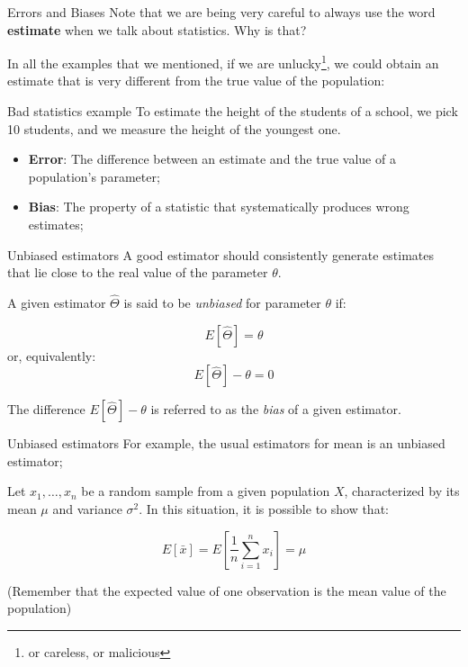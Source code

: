 \begin{frame}{Errors and Biases}
  Note that we are being very careful to always use the word {\bf estimate} when we talk about statistics. Why is that?
  \bigskip

  In all the examples that we mentioned, if we are unlucky\footnote{or careless, or malicious}, we could obtain an estimate that is very different from the true value of the population:
  \begin{alertblock}{Bad statistics example}
    To estimate the height of the students of a school, we pick 10 students, and we measure the height of the youngest one.
  \end{alertblock}\medskip
  \begin{itemize}
    \item {\bf Error}: The difference between an estimate and the true value of a population's parameter;
    \item {\bf Bias}: The property of a statistic that systematically produces wrong estimates;
  \end{itemize}
\end{frame}

\begin{frame}{Unbiased estimators}
A good estimator should consistently generate estimates that lie close to the real value of the parameter $\theta$.\bigskip

A given estimator $\hat{\Theta}$ is said to be \textit{unbiased} for parameter $\theta$ if:\bigskip

\begin{equation*}
E\left[\hat{\Theta}\right] = \theta
\end{equation*}
\noindent or, equivalently:
\begin{equation*}
E\left[\hat{\Theta}\right] - \theta = 0
\end{equation*}\bigskip

The difference $E\left[\hat{\Theta}\right] - \theta$ is referred to as the \textit{bias} of a given estimator.
\end{frame}

\begin{frame}{Unbiased estimators}
For example, the usual estimators for mean is an unbiased estimator;
\bigskip

Let $x_1,\ldots,x_n$ be a random sample from a given population $X$, characterized by its mean $\mu$ and variance $\sigma^2$. In this situation, it is possible to show that:
\bigskip

\begin{equation*}
E\left[\bar{x}\right] = E\left[\frac{1}{n}\sum\limits_{i=1}^{n}x_i\right] = \mu
\end{equation*}
\vfill

(Remember that the expected value of one observation is the mean value of the population)

\end{frame}

